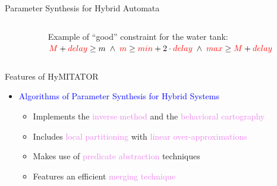 \documentclass[final]{beamer}
\newcommand{\refer}[1]{\textcolor{blue}{\cite{#1}}}
\newcommand{\param}[1]{\textcolor{red}{#1}}
\newcommand{\couleur}[1]{\textcolor{violet}{#1}}
\newcommand{\coulitem}[1]{\textcolor{blue}{#1}}
\newcommand{\hymitator}{HyMITATOR} %
\begin{document}
\begin{frame}{}
\begin{columns}[t]
\begin{column}{.45\linewidth}
\begin{block}{Parameter Synthesis for Hybrid Automata}
\begin{itemize}
\begin{itemize}
\begin{columns}
\begin{column}{0.5\textwidth}
\begin{center}
			\end{center}
		\end{column}

		\begin{column}{0.5\textwidth}
			\small
			Example of ``good'' constraint for the water tank: \\
		$\param{M} + \param{delay} \geq m \;\wedge\; \param{m} \geq \param{min} +
      2\cdot \param{delay} \;\wedge\; \param{max} \geq \param{M} + \param{delay}$
		\end{column}
		\end{columns}
		
		
  	\end{itemize}


\end{itemize}

\end{block}    


\begin{block}{Features of \hymitator{}}

\begin{itemize}
	\item \coulitem{Algorithms of Parameter Synthesis for Hybrid Systems}
	\begin{itemize}
		\item Implements the \couleur{inverse method} and the \couleur{behavioral cartography}
		\item Includes \couleur{local partitioning} with \couleur{linear over-approximations}
		\item Makes use of \couleur{predicate abstraction} techniques
		\item Features an efficient \couleur{merging technique}~\refer{afs12}
	\end{itemize}
	
	\vspace{0.5cm}

% 


\end{itemize}
\end{block}
\end{column}
\end{columns}
\end{frame}
\end{document}

